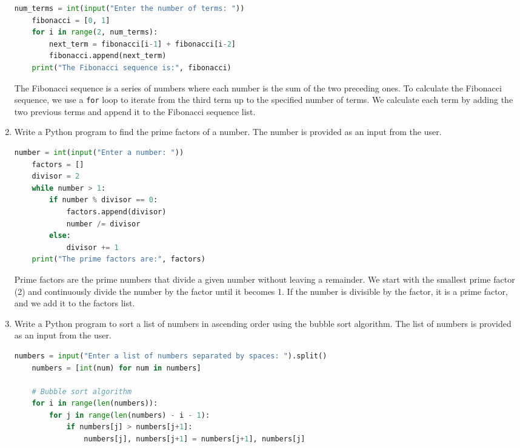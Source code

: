 \documentclass[12pt]{book}
\begin{document}
\begin{enumerate}
    \begin{lstlisting}[language=Python]
    num_terms = int(input("Enter the number of terms: "))
    fibonacci = [0, 1]
    for i in range(2, num_terms):
        next_term = fibonacci[i-1] + fibonacci[i-2]
        fibonacci.append(next_term)
    print("The Fibonacci sequence is:", fibonacci)
    \end{lstlisting}
    
    The Fibonacci sequence is a series of numbers where each number is the sum of the two preceding ones. To calculate the Fibonacci sequence, we use a \texttt{for} loop to iterate from the third term up to the specified number of terms. We calculate each term by adding the two previous terms and append it to the Fibonacci sequence list.
    
    \item Write a Python program to find the prime factors of a number. The number is provided as an input from the user.
    
    \begin{lstlisting}[language=Python]
    number = int(input("Enter a number: "))
    factors = []
    divisor = 2
    while number > 1:
        if number % divisor == 0:
            factors.append(divisor)
            number /= divisor
        else:
            divisor += 1
    print("The prime factors are:", factors)
    \end{lstlisting}
    
    Prime factors are the prime numbers that divide a given number without leaving a remainder. We start with the smallest prime factor (2) and continuously divide the number by the factor until it becomes 1. If the number is divisible by the factor, it is a prime factor, and we add it to the factors list.
    
    \item Write a Python program to sort a list of numbers in ascending order using the bubble sort algorithm. The list of numbers is provided as an input from the user.
    
    \begin{lstlisting}[language=Python]
    numbers = input("Enter a list of numbers separated by spaces: ").split()
    numbers = [int(num) for num in numbers]
    
    # Bubble sort algorithm
    for i in range(len(numbers)):
        for j in range(len(numbers) - i - 1):
            if numbers[j] > numbers[j+1]:
                numbers[j], numbers[j+1] = numbers[j+1], numbers[j]
    

\end{lstlisting}
\end{enumerate}
\end{document}
